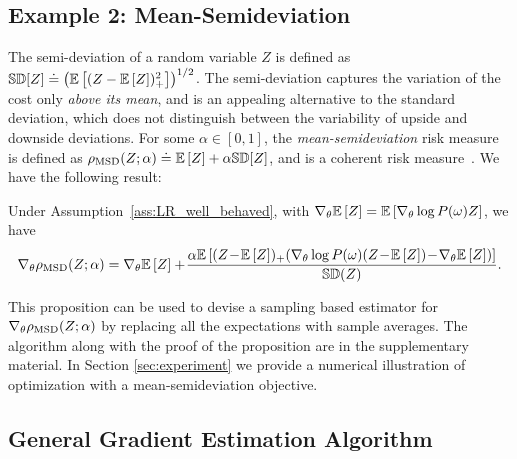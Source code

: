 \documentclass{article} %
\newcommand{\citep}{\cite}
\begin{document}
\subsection{Example 2: Mean-Semideviation}
\vspace{-0.1in}
The semi-deviation of a random variable $Z$ is defined as $\mathbb{SD}[Z] \doteq \left( \mathbb{E}\left[ (Z - \mathbb{E}\left[ Z \right])_{+}^{2} \right] \right)^{1 / 2}$. The semi-deviation captures the variation of the cost only \emph{above its mean}, and is an appealing alternative to the standard deviation, which does not distinguish between the variability of upside and downside deviations.
For some $\alpha \in[0,1]$, the \emph{mean-semideviation} risk measure is defined as $\rho_{\text{MSD}}(Z;\alpha) \doteq \mathbb{E}\left[ Z \right] + \alpha \mathbb{SD}[Z]$, and is a coherent risk measure~\citep{Shapiro2009}. We have the following result:
%
\begin{proposition}\label{prop:msd_grad}
Under Assumption~\ref{ass:LR_well_behaved}, with $\nabla_{\theta}{\mathbb{E}\left[ Z \right]} = \mathbb{E}\left[ \nabla_{\theta} \log P(\omega) Z \right]$, we have
%
\begin{equation*}
     \dt{\msd(Z;\alpha)} = \dt{\Exp{Z}} +
     \! \frac{\alpha \Exp{(Z \!-\! \Exp{Z})_{+} \!\left(\dt \log P(\omega) (Z \!-\! \Exp{Z}) \!-\! \dt{\Exp{Z}}\right)}}{\SD(Z)}.
\end{equation*}
\end{proposition}
%
This proposition can be used to devise a sampling based estimator for $\nabla_{\theta}{\rho_{\text{MSD}}(Z;\alpha)}$ by replacing all the expectations with sample averages. The algorithm along with the proof of the proposition are in the supplementary material. In Section \ref{sec:experiment} we provide a numerical illustration of optimization with a mean-semideviation objective.


\vspace{-0.1in}
\subsection{General Gradient Estimation Algorithm}
\vspace{-0.05in}
\end{document}
